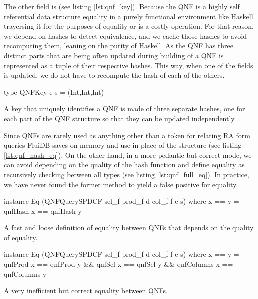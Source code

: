 The other field is  (see listing
\ref{lst:qnf_key}). Because the QNF is a highly self referential data
structure equality in a purely functional environment like Haskell
traversing it for the purposes of equality or is a costly operation.
For that reason, we depend on hashes to detect equivalence, and we
cache those hashes to avoid recomputing them, leaning on the purity of
Haskell. As the QNF has three distinct parts that are being often
updated during building of a QNF  is represented as a
tuple of their respective hashes. This way, when one of the fields is
updated, we do not have to recompute the hash of each of the others.

\begin{code}
  \begin{haskellcode}
    type QNFKey e s = (Int,Int,Int)
  \end{haskellcode}
  \caption{\label{lst:qnf_key}A key that uniquely identifies a QNF is
    made of three separate hashes, one for each part of the QNF
    structure so that they can be updated independently.}
\end{code}

Since QNFs are rarely used as anything other than a token for relating
RA form queries FluiDB saves on memory and use  in place
of the  structure (see listing
\ref{lst:qnf_hash_eq}). On the other hand, in a more pedantic but
correct mode, we can avoid depending on the quality of the hash
function and define equality as recursively checking between all types
(see listing \ref{lst:qnf_full_eq}). In practice, we have never found the
former method to yield a false positive for equality.

\begin{code}
  \begin{haskellcode}
    instance Eq (QNFQuerySPDCF sel_f prod_f d col_f f e s) where
      x == y = qnfHash x == qnfHash y
  \end{haskellcode}
  \caption{\label{lst:qnf_hash_eq}A fast and loose definition of
    equality between QNFs that depends on the quality of equality.}
\end{code}

\begin{code}
  \begin{haskellcode}
    instance Eq (QNFQuerySPDCF sel_f prod_f d col_f f e s) where
      x == y = qnfProd x == qnfProd y
        && qnfSel x == qnfSel y
        && qnfColumns x == qnfColumns y
  \end{haskellcode}
  \caption{\label{lst:qnf_full_eq}A very inefficient but correct
    equality between QNFs.}
\end{code}

